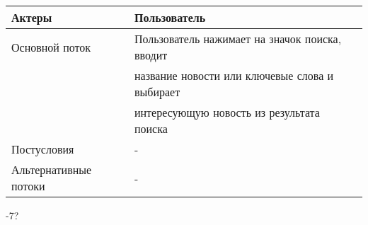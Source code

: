 \begin{center}
\begin{tabular}{|l|l|}
        \hline
        Актеры                & Пользователь                                   \\
        \hline
        Основной поток        & Пользователь нажимает на значок поиска, вводит \\
        & название новости или ключевые слова и выбирает \\
        & интересующую новость из результата поиска      \\
        \hline
        Постусловия           & -                                              \\
        \hline
        Альтернативные потоки & -                                              \\
        \hline
    \end{tabular}
\end{center}
\newpage
{}-7?
